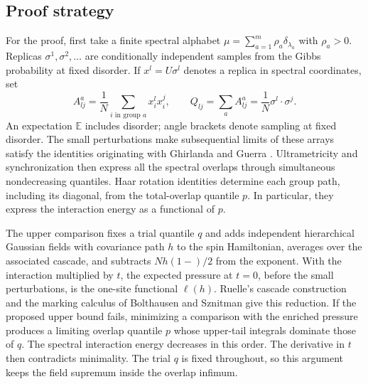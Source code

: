 \documentclass[11pt]{article}
\theoremstyle{definition}
\theoremstyle{remark}
\numberwithin{equation}{section}
\newcommand{\E}{\mathbb E}
\begin{document}
\subsection{Proof strategy}

For the proof, first take a finite spectral alphabet
$\mu=\sum_{a=1}^m\rho_a\delta_{\lambda_a}$ with $\rho_a>0$.
Replicas $\sigma^1,\sigma^2,\ldots$ are conditionally independent
samples from the Gibbs probability at fixed disorder. If
$x^l=U\sigma^l$ denotes a replica in spectral coordinates, set
\begin{equation}
 A^a_{lj}=\frac1N\sum_{i\text{ in group }a}x_i^l x_i^j,
 \qquad Q_{lj}=\sum_aA^a_{lj}
 =\frac1N\sigma^l\cdot\sigma^j.
 \label{eq:overlaps}
\end{equation}
An expectation $\E$ includes disorder; angle brackets denote sampling
at fixed disorder. The small perturbations make subsequential limits of
these arrays satisfy the identities originating with Ghirlanda and Guerra
\cite{GhirlandaGuerra1998}. Ultrametricity and synchronization
\cite{PanchenkoUltra,PanchenkoMulti} then express all the spectral
overlaps through simultaneous nondecreasing quantiles. Haar rotation
identities determine each group path, including its diagonal, from the
total-overlap quantile $p$. In particular, they express the interaction
energy as a functional of $p$.

The upper comparison fixes a trial quantile $q$ and adds independent
hierarchical Gaussian fields with covariance path $h$ to the spin
Hamiltonian, averages over the associated cascade, and subtracts
$Nh(1-)/2$ from the exponent. With the interaction multiplied by $t$,
the expected pressure at $t=0$, before the small perturbations,
is the one-site functional $\ell(h)$. Ruelle's cascade
construction \cite{Ruelle1987} and the marking calculus of Bolthausen and
Sznitman \cite{BolthausenSznitman} give this reduction. If the proposed
upper bound fails, minimizing a comparison with the enriched pressure
produces a limiting overlap quantile $p$ whose upper-tail integrals
dominate those of $q$. The spectral interaction energy decreases in
this order. The derivative in $t$ then contradicts minimality. The trial
$q$ is fixed throughout, so this argument keeps the field supremum inside
the overlap infimum.
\end{document}
